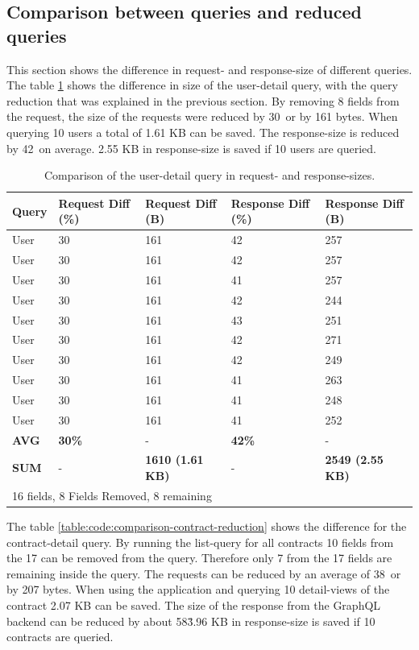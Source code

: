 \subsection{Comparison between queries and reduced queries}

This section shows the difference in request- and response-size of different queries. The table \ref{table:code:comparison-user-reduction} shows the difference in size of the user-detail query, with the query reduction that was explained in the previous section. By removing 8 fields from the request, the size of the requests were reduced by 30\ or by 161 bytes. When querying 10 users a total of 1.61 KB can be saved. The response-size is reduced by 42\ on average. 2.55 KB in response-size is saved if 10 users are queried.

\ifshowTables
\begin{table}[H]
  \begin{tabular}{|l|l|l|l|l|}
  \hline
  Query & Request Diff (\%) & Request Diff (B) & Response Diff (\%) & Response Diff (B) \\
  \hline
  User & 30\ & 161 & 42\ & 257 \\
  \hline
  User & 30\ & 161 & 42\ & 257 \\
  \hline
  User & 30\ & 161 & 41\ & 257 \\
  \hline
  User & 30\ & 161 & 42\ & 244 \\
  \hline
  User & 30\ & 161 & 43\ & 251 \\
  \hline
  User & 30\ & 161 & 42\ & 271 \\
  \hline
  User & 30\ & 161 & 42\ & 249 \\
  \hline
  User & 30\ & 161 & 41\ & 263 \\
  \hline
  User & 30\ & 161 & 41\ & 248 \\
  \hline
  User & 30\ & 161 & 41\ & 252 \\
  \hline
  \hline
  \textbf{AVG} & \textbf{30\%} & - & \textbf{42\%} & -  \\
  \hline
  \textbf{SUM} & - & \textbf{1610 (1.61 KB)} & - & \textbf{2549 (2.55 KB)} \\
  \hline
  \multicolumn{5}{l}{16 fields, 8 Fields Removed, 8 remaining}
  \end{tabular}
  \caption{Comparison of the user-detail query in request- and response-sizes.}\label{table:code:comparison-user-reduction}
\end{table}
\fi

The table \ref{table:code:comparison-contract-reduction} shows the difference for the contract-detail query. By running the list-query for all contracts 10 fields from the 17 can be removed from the query. Therefore only 7 from the 17 fields are remaining inside the query. The requests can be reduced by an average of 38\ or by 207 bytes. When using the application and querying 10 detail-views of the contract 2.07 KB can be saved. The size of the response from the GraphQL backend can be reduced by about 58\. 3.96 KB in response-size is saved if 10 contracts are queried.

